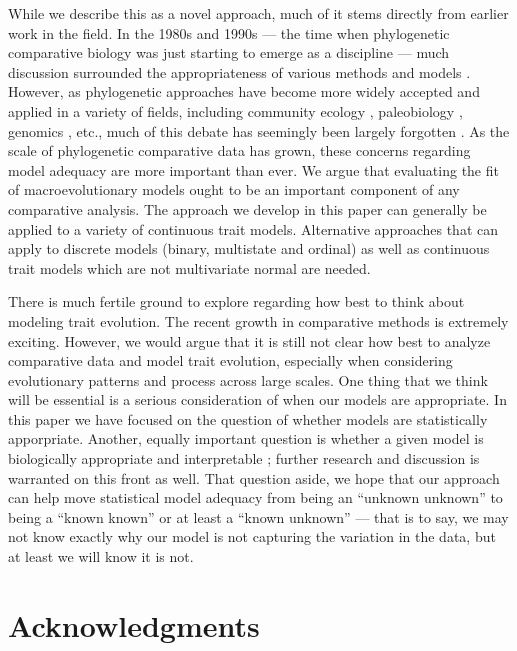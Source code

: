 \documentclass[a4paper,12pt]{article}
\begin{document}
While we describe this as a novel approach, much of it stems directly from earlier work in the field. In the 1980s and 1990s --- the time when phylogenetic comparative biology was just starting to emerge as a discipline --- much discussion surrounded the appropriateness of various methods and models \citep{Felsenstein1985, Felsenstein1988, HarveyPagel1991, Garland1992, Pagel1993, Diaz1996, Price1997, Garland1999, GarlandIves2000}. However, as phylogenetic approaches have become more widely accepted and applied in a variety of fields, including community ecology \citep{Webb2002, CB2009}, paleobiology \citep{Hunt2012}, genomics \citep{NielsenMBE}, etc., much of this debate has seemingly been largely forgotten \citep[but see][for recent discussions]{Losos2011, Hansen2012}. As the scale of phylogenetic comparative data has grown, these concerns regarding model adequacy are more important than ever. We argue that evaluating the fit of macroevolutionary models ought to be an important component of any comparative analysis. The approach we develop in this paper can generally be applied to a variety of continuous trait models. Alternative approaches that can apply to discrete models (binary, multistate and ordinal) as well as continuous trait models which are not multivariate normal are needed. 

There is much fertile ground to explore regarding how best to think about modeling trait evolution. The recent growth in comparative methods is extremely exciting. However, we would argue that it is still not clear how best to analyze comparative data and model trait evolution, especially when considering evolutionary patterns and process across large scales. One thing that we think will be essential is a serious consideration of when our models are appropriate. In this paper we have focused on the question of whether models are statistically apporpriate. Another, equally important question is whether a given model is biologically appropriate and interpretable \citep{Hansen2012}; further research and discussion is warranted on this front as well. That question aside, we hope that our approach can help move statistical model adequacy from being an ``unknown unknown''  to being a ``known known'' or at least a ``known unknown'' --- that is to say, we may not know exactly why our model is not capturing the variation in the data, but at least we will know it is not.


\section*{Acknowledgments}
\end{document}

